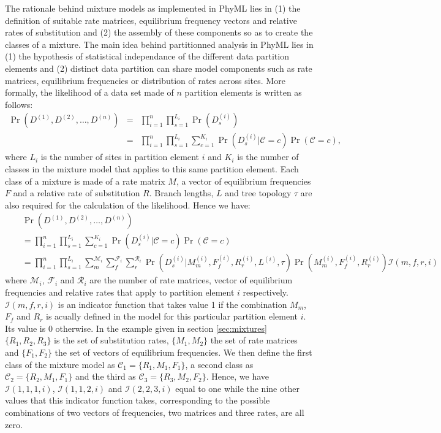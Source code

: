 \documentclass[a4paper,12pt]{article}
\begin{document}
The rationale behind mixture  models as implemented in PhyML lies in (1)  the definition of suitable
rate matrices, equilibrium frequency vectors and relative rates of substitution and (2) the assembly
of these  components so as  to create the  classes of a mixture.  The main idea  behind partitionned
analysis in  PhyML lies  in (1)  the hypothesis of  statistical independance  of the  different data
partition elements and (2) distinct data partition can share model components such as rate matrices,
equilibrium frequencies or  distribution of rates across  sites. More formally, the  likelihood of a
data set made of $n$ partition elements is written as follows:
\begin{eqnarray*}
\Pr(D^{(1)},D^{(2)},\ldots,D^{(n)}) &=& \prod_{i=1}^{n}  \prod_{s=1}^{L_i} \Pr(D^{(i)}_s) \\
&=& \prod_{i=1}^{n}  \prod_{s=1}^{L_i} \sum_{c=1}^{K_i} \Pr(D^{(i)}_s|\mathcal{C}=c) \Pr(\mathcal{C}=c),
\end{eqnarray*}
where $L_i$ is  the number of sites in partition  element $i$ and $K_i$ is the  number of classes in
the mixture model that applies to this same partition  element. Each class of a mixture is made of a
rate  matrix $M$,  a vector  of equilibrium  frequencies  $F$ and  a relative  rate of  substitution
$R$. Branch  lengths, $L$ and  tree topology $\tau$  are also required  for the calculation  of the
likelihood. Hence we have:
\begin{eqnarray*}
&& \Pr(D^{(1)},D^{(2)},\ldots,D^{(n)})  \\
&&=  \prod_{i=1}^{n}  \prod_{s=1}^{L_i} \sum_{c=1}^{K_i} \Pr(D^{(i)}_s|\mathcal{C}=c) \Pr(\mathcal{C}=c) \\
&&= \prod_{i=1}^{n}  \prod_{s=1}^{L_i} \sum_{m}^{\mathcal{M}_i} \sum_{f}^{\mathcal{F}_i} \sum_{r}^{\mathcal{R}_i}  \Pr(D^{(i)}_s|M_m^{(i)},F_f^{(i)},R_r^{(i)},L^{(i)},\tau) \Pr(M_m^{(i)},F_f^{(i)},R_r^{(i)}) \mathcal{I}(m,f,r,i)
\end{eqnarray*}
where $\mathcal{M}_i$, $\mathcal{F}_i$ and $\mathcal{R}_i$ are the number of rate matrices,
vector of equilibrium frequencies and relative rates that apply to partition element $i$
respectively. $\mathcal{I}(m,f,r,i)$ is an indicator function that takes value 1 if the combination
$M_m$, $F_f$ and $R_r$ is acually defined in the model for this particular partition element
$i$. Its value is 0 otherwise. In the example given in section \ref{sec:mixtures} $\{R_1,R_2,R_3\}$
is the  set of substitution  rates, $\{M_1,M_2\}$ the set of rate matrices and $\{F_1,F_2\}$ the set  of vectors of equilibrium frequencies.  We then
define the first class of the mixture model  as $\mathcal{C}_1 = \{R_1,M_1,F_1\}$, a second class as
$\mathcal{C}_2  = \{R_2,M_1,F_1\}$ and the third as $\mathcal{C}_3  = \{R_3,M_2,F_2\}$. Hence, we
have $\mathcal{I}(1,1,1,i)$, $\mathcal{I}(1,1,2,i)$ and $\mathcal{I}(2,2,3,i)$ equal to one while
the nine other values that this indicator function takes, corresponding to the possible combinations of
two vectors of frequencies, two  matrices and three rates, are all zero.
\end{document}
